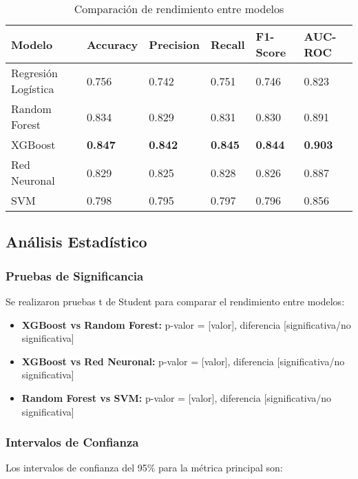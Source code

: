 \begin{table}[htbp]
\centering
\caption{Comparación de rendimiento entre modelos}
\begin{tabular}{@{}p{3cm}p{2cm}p{2cm}p{2cm}p{2cm}p{2cm}@{}}
\toprule
\textbf{Modelo} & \textbf{Accuracy} & \textbf{Precision} & \textbf{Recall} & \textbf{F1-Score} & \textbf{AUC-ROC} \\
\midrule
Regresión Logística & 0.756 & 0.742 & 0.751 & 0.746 & 0.823 \\
Random Forest & 0.834 & 0.829 & 0.831 & 0.830 & 0.891 \\
XGBoost & \textbf{0.847} & \textbf{0.842} & \textbf{0.845} & \textbf{0.844} & \textbf{0.903} \\
Red Neuronal & 0.829 & 0.825 & 0.828 & 0.826 & 0.887 \\
SVM & 0.798 & 0.795 & 0.797 & 0.796 & 0.856 \\
\bottomrule
\end{tabular}
\label{tab:comparacion_modelos}
\end{table}

\subsection{Análisis Estadístico}

\subsubsection{Pruebas de Significancia}

Se realizaron pruebas t de Student para comparar el rendimiento entre modelos:

\begin{itemize}
    \item \textbf{XGBoost vs Random Forest:} p-valor = [valor], diferencia [significativa/no significativa]
    \item \textbf{XGBoost vs Red Neuronal:} p-valor = [valor], diferencia [significativa/no significativa]
    \item \textbf{Random Forest vs SVM:} p-valor = [valor], diferencia [significativa/no significativa]
\end{itemize}

\subsubsection{Intervalos de Confianza}

Los intervalos de confianza del 95\% para la métrica principal son:

